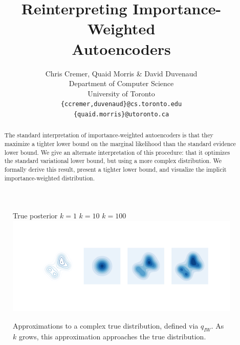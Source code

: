 \documentclass{article} %
\title{Reinterpreting Importance-Weighted \\Autoencoders}
\author{Chris Cremer, Quaid Morris \& David Duvenaud \\
Department of Computer Science\\
University of Toronto\\
\texttt{\{ccremer,duvenaud\}@cs.toronto.edu} \\
\texttt{\{quaid.morris\}@utoronto.ca}
}
\begin{document}
\maketitle

\begin{abstract}
The standard interpretation of importance-weighted autoencoders is that they maximize a tighter lower bound on the marginal likelihood than the standard evidence lower bound.
We give an alternate interpretation of this procedure: that it optimizes the standard variational lower bound, but using a more complex distribution. 
We formally derive this result, present a tighter lower bound, and visualize the implicit importance-weighted distribution.
\end{abstract}
 

\begin{figure}[b]
  \centering
   True posterior \qquad  \qquad $k=1$  \qquad \qquad \qquad $k=10$ \qquad \qquad \qquad $k=100$ \quad
      \includegraphics[width=1.\textwidth, clip, trim=2.5cm 3.9cm 2cm 3.6cm]{figs/figure_1.png}
  \vspace{-5mm}
  \caption{Approximations to a complex true distribution, defined via $q_{IW}$.
  As $k$ grows, this approximation approaches the true distribution.}
  \label{viz1}
\end{figure}
\end{document}
